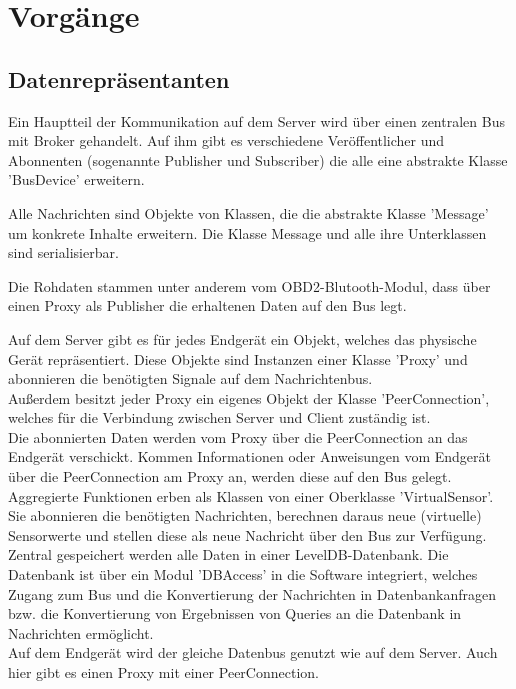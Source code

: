 \documentclass[entwurf.tex]{subfiles}
\begin{document}
\chapter{Vorgänge}
\section{Datenrepräsentanten}
Ein Hauptteil der Kommunikation auf dem Server wird über einen zentralen Bus mit Broker gehandelt. Auf ihm gibt es verschiedene Veröffentlicher und Abonnenten (sogenannte Publisher und Subscriber) die alle eine abstrakte Klasse 'BusDevice' erweitern.

Alle Nachrichten sind Objekte von Klassen, die die abstrakte Klasse 'Message' um konkrete Inhalte erweitern. Die Klasse Message und alle ihre Unterklassen sind serialisierbar.

Die Rohdaten stammen unter anderem vom OBD2-Blutooth-Modul, dass über einen Proxy als Publisher die erhaltenen Daten auf den Bus legt.

Auf dem Server gibt es für jedes Endgerät ein Objekt, welches das physische Gerät repräsentiert. Diese Objekte sind Instanzen einer Klasse 'Proxy' und abonnieren die benötigten Signale auf dem Nachrichtenbus. \\
Außerdem besitzt jeder Proxy ein eigenes Objekt der Klasse 'PeerConnection', welches für die Verbindung zwischen Server und Client zuständig ist. \\
Die abonnierten Daten werden vom Proxy über die PeerConnection an das Endgerät verschickt. Kommen Informationen oder Anweisungen vom Endgerät über die PeerConnection am Proxy an, werden diese auf den Bus gelegt. \\
Aggregierte Funktionen erben als Klassen von einer Oberklasse 'VirtualSensor'. Sie abonnieren die benötigten Nachrichten, berechnen daraus neue (virtuelle) Sensorwerte und stellen diese als neue Nachricht über den Bus zur Verfügung. \\

Zentral gespeichert werden alle Daten in einer LevelDB-Datenbank. Die Datenbank ist über ein Modul 'DBAccess' in die Software integriert, welches Zugang zum Bus und die Konvertierung der Nachrichten in Datenbankanfragen bzw. die Konvertierung von Ergebnissen von Queries an die Datenbank in Nachrichten ermöglicht. \\

Auf dem Endgerät wird der gleiche Datenbus genutzt wie auf dem Server. Auch hier gibt es einen Proxy mit einer PeerConnection.
\end{document}
